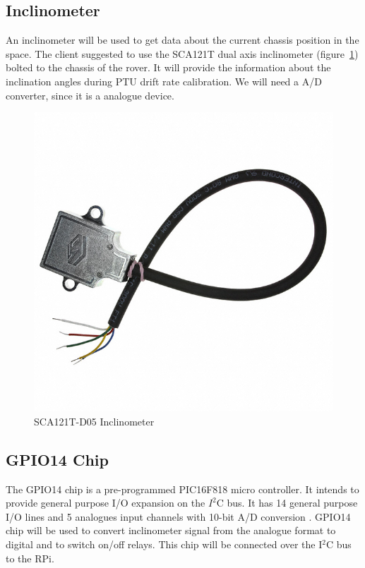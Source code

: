 \subsection{Inclinometer}
An inclinometer will be used to get data about the current chassis position in the space. The client suggested to use the SCA121T dual axis inclinometer (figure~\ref{fig:SCA121T-D05_inclinometer}) bolted to the chassis of the rover. It will provide the information about the inclination angles during PTU drift rate calibration. We will need a A/D converter, since it is a analogue device.

\begin{figure}[H]
\centering
\centerline{\includegraphics[scale=0.20]{./images/SCA121T}}
\caption{SCA121T-D05 Inclinometer}
\label{fig:SCA121T-D05_inclinometer}
\end{figure}

\subsection{GPIO14 Chip}
The GPIO14 chip is a pre-programmed PIC16F818 micro controller. It intends to provide general purpose I/O expansion on the $I^2$C bus. It has 14 general purpose I/O lines and 5 analogues input channels with 10-bit A/D conversion \cite{GPIO14}. GPIO14 chip will be used to convert inclinometer signal from the analogue format to digital and to switch on/off relays. This chip will be connected over the I$^2$C bus to the RPi.

